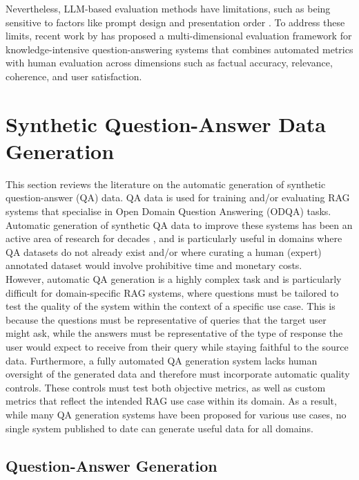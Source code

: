 Nevertheless, LLM-based evaluation methods have limitations, such as being sensitive to factors like prompt design and presentation order \cite{wang2023large}. To address these limits, recent work by \cite{li2023halueval} has proposed a multi-dimensional evaluation framework for knowledge-intensive question-answering systems that combines automated metrics with human evaluation across dimensions such as factual accuracy, relevance, coherence, and user satisfaction.


\section{Synthetic Question-Answer Data Generation}

This section reviews the literature on the automatic generation of synthetic question-answer (QA) data. QA data is used for training and/or evaluating RAG systems that specialise in Open Domain Question Answering (ODQA) tasks. Automatic generation of synthetic QA data to improve these systems has been an active area of research for decades \cite{mitkov_mcq} \cite{rus2010first}, and is particularly useful in domains where QA datasets do not already exist and/or where curating a human (expert) annotated dataset would involve prohibitive time and monetary costs.\\

However, automatic QA generation is a highly complex task and is particularly difficult for domain-specific RAG systems, where questions must be tailored to test the quality of the system within the context of a specific use case. This is because the questions must be representative of queries that the target user might ask, while the answers must be representative of the type of response the user would expect to receive from their query while staying faithful to the source data. Furthermore, a fully automated QA generation system lacks human oversight of the generated data and therefore must incorporate automatic quality controls. These controls must test both objective metrics, as well as custom metrics that reflect the intended RAG use case within its domain. As a result, while many QA generation systems have been proposed for various use cases, no single system published to date can generate useful data for all domains. 


\subsection{Question-Answer Generation}

